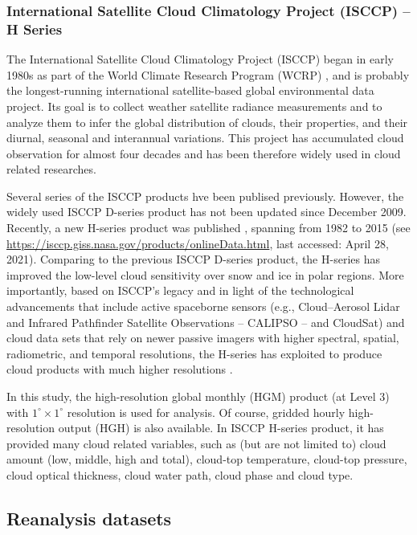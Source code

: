 \subsubsection{International Satellite Cloud Climatology Project (ISCCP) -- H Series}

The International Satellite Cloud Climatology Project (ISCCP) began in early 1980s as part of the World Climate Research Program (WCRP) \citep{Schiffer1983,Rossow1991}, and is probably the longest-running international satellite-based global environmental data project. Its goal is to collect weather satellite radiance measurements and to analyze them to infer the global distribution of clouds, their properties, and their diurnal, seasonal and interannual variations. This project has accumulated cloud observation for almost four decades and has been therefore widely used in cloud related researches.

Several series of the ISCCP products hve been publised previously. However, the widely used ISCCP D-series product \citep{Rossow1999advances} has not been updated since December 2009. Recently, a new H-series product was published \citep{Young2018}, spanning from 1982 to 2015 (see \url{https://isccp.giss.nasa.gov/products/onlineData.html}, last accessed: April 28, 2021). Comparing to the previous ISCCP D-series product, the H-series has improved the low-level cloud sensitivity over snow and ice in polar regions. More importantly, based on ISCCP’s legacy and in light of the technological advancements that include active spaceborne sensors (e.g., Cloud–Aerosol Lidar and Infrared Pathfinder Satellite Observations – CALIPSO – and CloudSat) and cloud data sets that rely on newer passive imagers with higher spectral, spatial, radiometric, and temporal resolutions, the H-series has exploited to produce cloud products with much higher resolutions \citep{Young2018}.

In this study, the high-resolution global monthly (HGM) product (at Level 3) with $1^\circ \times 1^\circ$ resolution is used for analysis. Of course, gridded hourly high-resolution output (HGH) is also available. In ISCCP H-series product, it has provided many cloud related variables, such as (but are not limited to) cloud amount (low, middle, high and total), cloud-top temperature, cloud-top pressure, cloud optical thickness, cloud water path, cloud phase and cloud type.

\subsection{Reanalysis datasets}

